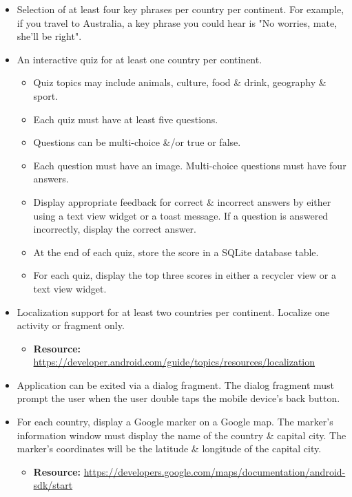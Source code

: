 \documentclass{article}
\begin{document}
\begin{itemize}
\begin{itemize}
	      \end{itemize}
	\item Selection of at least four key phrases per country per continent. For example, if you travel to Australia, a key phrase you could hear is "No worries, mate, she'll be right".
	\item An interactive quiz for at least one country per continent.
	      \begin{itemize}
	      	\item Quiz topics may include animals, culture, food \& drink, geography \& sport.
	      	\item Each quiz must have at least five questions.
	      	\item Questions can be multi-choice \&/or true or false.
	      	\item Each question must have an image. Multi-choice questions must have four answers.
	      	\item Display appropriate feedback for correct \& incorrect answers by either using a text view widget or a toast message. If a question is answered incorrectly, display the correct answer.
	      	\item At the end of each quiz, store the score in a SQLite database table. 
	      	\item For each quiz, display the top three scores in either a recycler view or a text view widget.
	      \end{itemize}
	\item Localization support for at least two countries per continent. Localize one activity or fragment only.
	      \begin{itemize}
	      	\item \textbf{Resource:} \footnotesize\href{https://developer.android.com/guide/topics/resources/localization/}{https://developer.android.com/guide/topics/resources/localization}
	      \end{itemize}
	\item Application can be exited via a dialog fragment. The dialog fragment must prompt the user when the user double taps the mobile device's back button.
	\item For each country, display a Google marker on a Google map. The marker's information window must display the name of the country \& capital city. The marker's coordinates will be the latitude \& longitude of the capital city.
	      \begin{itemize}
	      	\item \textbf{Resource:} \footnotesize\href{https://developers.google.com/maps/documentation/android-sdk/start}{https://developers.google.com/maps/documentation/android-sdk/start}

\end{itemize}
\end{itemize}
\end{document}
